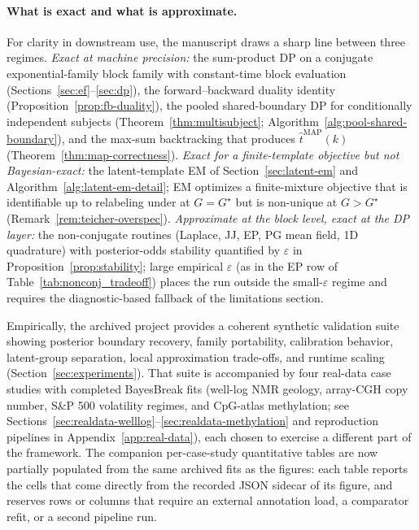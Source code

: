 \paragraph{What is exact and what is approximate.}
For clarity in downstream use, the manuscript draws a sharp line between three regimes.
\emph{Exact at machine precision:} the sum-product DP on a conjugate exponential-family block
family with constant-time block evaluation (Sections~\ref{sec:ef}--\ref{sec:dp}), the
forward--backward duality identity (Proposition~\ref{prop:fb-duality}), the pooled
shared-boundary DP for conditionally independent subjects
(Theorem~\ref{thm:multisubject}; Algorithm~\ref{alg:pool-shared-boundary}), and the max-sum
backtracking that produces $\widehat t^{\mathrm{MAP}}(k)$ (Theorem~\ref{thm:map-correctness}).
\emph{Exact for a finite-template objective but not Bayesian-exact:} the latent-template EM of
Section~\ref{sec:latent-em} and Algorithm~\ref{alg:latent-em-detail}; EM optimizes a
finite-mixture objective that is identifiable up to relabeling under
\citet{teicher1963identifiability} at $G=G^\star$ but is non-unique at $G>G^\star$
(Remark~\ref{rem:teicher-overspec}). \emph{Approximate at the block level, exact at the DP
layer:} the non-conjugate routines (Laplace, JJ, EP, PG mean field, 1D quadrature) with
posterior-odds stability quantified by $\varepsilon$ in
Proposition~\ref{prop:stability}; large empirical $\varepsilon$ (as in the EP row of
Table~\ref{tab:nonconj_tradeoff}) places the run outside the small-$\varepsilon$ regime and
requires the diagnostic-based fallback of the limitations section.

Empirically, the archived project provides a coherent synthetic validation suite showing posterior
boundary recovery, family portability, calibration behavior, latent-group separation, local
approximation trade-offs, and runtime scaling (Section~\ref{sec:experiments}). That suite is
accompanied by four real-data case studies with completed BayesBreak fits (well-log NMR geology, array-CGH
copy number, S\&P 500 volatility regimes, and CpG-atlas methylation; see
Sections~\ref{sec:realdata-welllog}--\ref{sec:realdata-methylation} and reproduction pipelines in
Appendix~\ref{app:real-data}), each chosen to exercise a different part of the framework. The
companion per-case-study quantitative tables are now partially populated from the same archived
fits as the figures: each table reports the cells that come directly from the recorded JSON
sidecar of its figure, and reserves rows or columns that require an external annotation load,
a comparator refit, or a second pipeline run.

